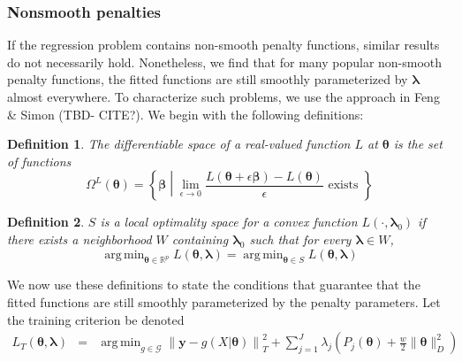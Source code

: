 \documentclass[12pt]{article}
\newtheorem{definition}{Definition}
\DeclareMathOperator*{\argmin}{arg\,min}
\begin{document}
\subsubsection{Nonsmooth penalties}\label{sec:nonsmooth}

If the regression problem contains non-smooth penalty functions, similar results do not necessarily hold. Nonetheless, we find that for many popular non-smooth penalty functions, the fitted functions are still smoothly parameterized by $\boldsymbol \lambda$ almost everywhere. To characterize such problems, we use the approach in Feng \& Simon (TBD- CITE?). We begin with the following definitions:

\begin{definition}
	The differentiable space of a real-valued function $L$ at $\boldsymbol{\theta}$ is the set of functions
	\begin{equation}
	\Omega^{L}(\boldsymbol{\theta}) = \left \{ \boldsymbol{\beta} \middle | \lim_{\epsilon \rightarrow 0} \frac{L(\boldsymbol{\theta} + \epsilon \boldsymbol{\beta}) - L(\boldsymbol{\theta})}{\epsilon} \text{ exists } \right \}
	\end{equation}
\end{definition}

\begin{definition}
	$S$ is a local optimality space for a convex function $L(\cdot, \boldsymbol \lambda_0)$ if there exists a neighborhood $W$ containing $\boldsymbol \lambda_0$ such that for every $\boldsymbol \lambda \in W$,
	\begin{equation}
	\argmin_{\boldsymbol{\theta} \in \mathbb{R}^p} L(\boldsymbol{\theta}, \boldsymbol \lambda) =
	\argmin_{\boldsymbol{\theta} \in S} L(\boldsymbol{\theta}, \boldsymbol \lambda)
	\end{equation}
\end{definition}

We now use these definitions to state the conditions that guarantee that the fitted functions are still smoothly parameterized by the penalty parameters.
Let the training criterion be denoted
\begin{eqnarray*}
	L_T(\boldsymbol{\theta}, \boldsymbol{\lambda}) &=& \argmin_{g\in \mathcal{G}} 
	\left \| \boldsymbol y -  g(X| \boldsymbol{\theta}) \right \|^2_T 
	+ \sum_{j=1}^J \lambda_j \left ( P_j(\boldsymbol{\theta}) + \frac{w}{2} \| \boldsymbol{\theta} \|^2_D \right )
\end{eqnarray*}
\end{document}
